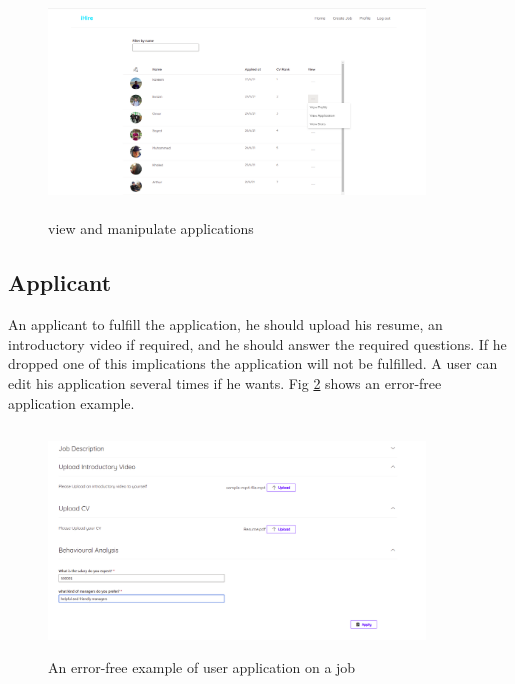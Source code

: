 \begin{figure}[h!]
\centering
\includegraphics[width=10cm,height=6cm, frame]{images/User Interface/view.png}
\caption{view and manipulate applications}
\label{fig:view_insights}
\end{figure}



\subsection*{Applicant}

An applicant to fulfill the application, he should upload his resume, an introductory video if required, and he should answer the required questions. If he dropped one of this implications the application will not be fulfilled. A user can edit his application several times if he wants. Fig \ref{fig:apply_job_correct} shows an error-free application example.


\begin{figure}[h!]
\centering
\includegraphics[width=10cm,height=6cm, frame]{images/apply.png}
\caption{An error-free example of user application on a job}
\label{fig:apply_job_correct}
\end{figure}

